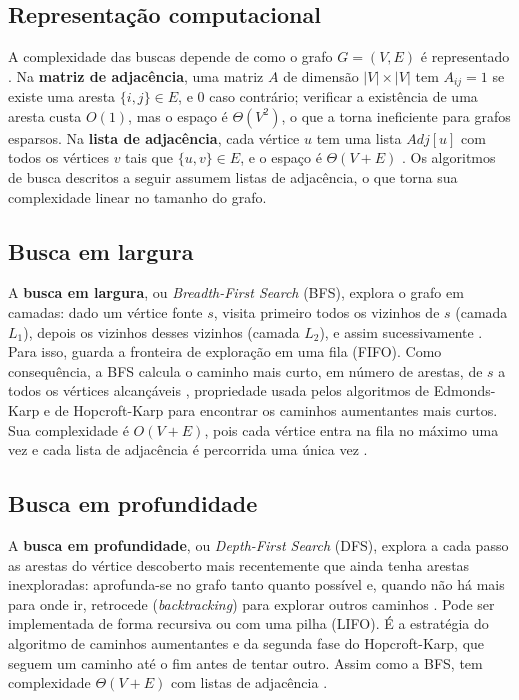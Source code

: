 \subsection{Representação computacional}

A complexidade das buscas depende de como o grafo $G=(V,E)$ é representado \cite{aho}. Na \textbf{matriz de adjacência}, uma matriz $A$ de dimensão $|V| \times |V|$ tem $A_{ij} = 1$ se existe uma aresta $\{i,j\} \in E$, e $0$ caso contrário; verificar a existência de uma aresta custa $O(1)$, mas o espaço é $\Theta(V^2)$, o que a torna ineficiente para grafos esparsos. Na \textbf{lista de adjacência}, cada vértice $u$ tem uma lista $Adj[u]$ com todos os vértices $v$ tais que $\{u,v\} \in E$, e o espaço é $\Theta(V+E)$ \cite{cormen}. Os algoritmos de busca descritos a seguir assumem listas de adjacência, o que torna sua complexidade linear no tamanho do grafo.

\subsection{Busca em largura}

A \textbf{busca em largura}, ou \textit{Breadth-First Search} (BFS), explora o grafo em camadas: dado um vértice fonte $s$, visita primeiro todos os vizinhos de $s$ (camada $L_1$), depois os vizinhos desses vizinhos (camada $L_2$), e assim sucessivamente \cite{kleinberg}. Para isso, guarda a fronteira de exploração em uma fila (FIFO). Como consequência, a BFS calcula o caminho mais curto, em número de arestas, de $s$ a todos os vértices alcançáveis \cite{dasgupta}, propriedade usada pelos algoritmos de Edmonds-Karp e de Hopcroft-Karp para encontrar os caminhos aumentantes mais curtos. Sua complexidade é $O(V+E)$, pois cada vértice entra na fila no máximo uma vez e cada lista de adjacência é percorrida uma única vez \cite{cormen}.

\subsection{Busca em profundidade}

A \textbf{busca em profundidade}, ou \textit{Depth-First Search} (DFS), explora a cada passo as arestas do vértice descoberto mais recentemente que ainda tenha arestas inexploradas: aprofunda-se no grafo tanto quanto possível e, quando não há mais para onde ir, retrocede (\textit{backtracking}) para explorar outros caminhos \cite{manber}. Pode ser implementada de forma recursiva ou com uma pilha (LIFO). É a estratégia do algoritmo de caminhos aumentantes e da segunda fase do Hopcroft-Karp, que seguem um caminho até o fim antes de tentar outro. Assim como a BFS, tem complexidade $\Theta(V+E)$ com listas de adjacência \cite{cormen}.


